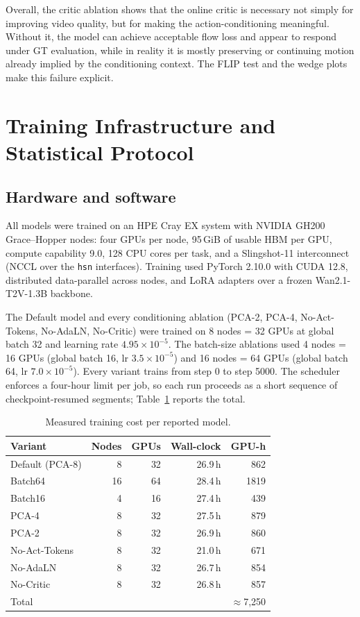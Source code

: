 \documentclass[letterpaper]{article} %
\begin{document}
Overall, the critic ablation shows that the online critic is necessary not
simply for improving video quality, but for making the action-conditioning
meaningful. Without it, the model can achieve acceptable flow loss and appear
to respond under GT evaluation, while in reality it is mostly preserving or
continuing motion already implied by the conditioning context. The FLIP test
and the wedge plots make this failure explicit.

\section{Training Infrastructure and Statistical Protocol}
\label{app:compute}

\subsection{Hardware and software}

All models were trained on an HPE Cray EX system with NVIDIA GH200
Grace--Hopper nodes: four GPUs per node, 95\,GiB of usable HBM per GPU, compute
capability 9.0, 128 CPU cores per task, and a Slingshot-11 interconnect
(NCCL over the \texttt{hsn} interfaces). Training used PyTorch 2.10.0 with CUDA
12.8, distributed data-parallel across nodes, and LoRA adapters over a frozen
Wan2.1-T2V-1.3B backbone.

The Default model and every conditioning ablation (PCA-2, PCA-4, No-Act-Tokens,
No-AdaLN, No-Critic) were trained on 8 nodes = 32 GPUs at global batch 32 and
learning rate $4.95\times10^{-5}$. The batch-size ablations used 4 nodes = 16
GPUs (global batch 16, lr $3.5\times10^{-5}$) and 16 nodes = 64 GPUs (global
batch 64, lr $7.0\times10^{-5}$). Every variant trains from step 0 to step 5000.
The scheduler enforces a four-hour limit per job, so each run proceeds as a
short sequence of checkpoint-resumed segments; Table~\ref{tab:compute} reports
the total.

\begin{table}[t]
\centering
\small
\begin{tabular}{lrrrr}
\toprule
Variant & Nodes & GPUs & Wall-clock & GPU-h \\
\midrule
Default (PCA-8)   & 8  & 32 & 26.9\,h & 862 \\
Batch64           & 16 & 64 & 28.4\,h & 1819 \\
Batch16           & 4  & 16 & 27.4\,h & 439 \\
PCA-4             & 8  & 32 & 27.5\,h & 879 \\
PCA-2             & 8  & 32 & 26.9\,h & 860 \\
No-Act-Tokens     & 8  & 32 & 21.0\,h & 671 \\
No-AdaLN          & 8  & 32 & 26.7\,h & 854 \\
No-Critic         & 8  & 32 & 26.8\,h & 857 \\
\midrule
\multicolumn{4}{l}{Total} & $\approx$7{,}250 \\
\bottomrule
\end{tabular}
\caption{Measured training cost per reported model.}
\label{tab:compute}
\end{table}
\end{document}
